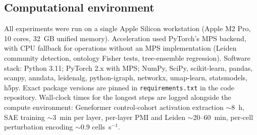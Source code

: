 \subsection*{Computational environment}

All experiments were run on a single Apple Silicon workstation (Apple M2 Pro, 10 cores, 32~GB
unified memory). Acceleration used PyTorch's MPS backend, with CPU fallback for operations without
an MPS implementation (Leiden community detection, ontology Fisher tests, tree-ensemble regression).
Software stack: Python 3.11; PyTorch 2.x with MPS; NumPy, SciPy, scikit-learn, pandas, scanpy,
anndata, leidenalg, python-igraph, networkx, umap-learn, statsmodels, h5py. Exact package versions
are pinned in \texttt{requirements.txt} in the code repository. Wall-clock times for the longest
steps are logged alongside the compute environment: Geneformer control-cohort activation extraction
$\sim$8~h, SAE training $\sim$3~min per layer, per-layer PMI and Leiden $\sim$20--60~min,
per-cell perturbation encoding $\sim$0.9 cells~s$^{-1}$.
